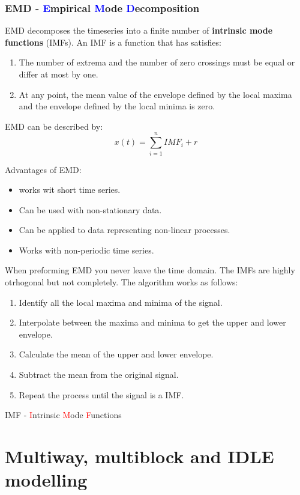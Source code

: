 \subsubsection{EMD - \textcolor{blue}{E}mpirical \textcolor{blue}{M}ode \textcolor{blue}{D}ecomposition}
EMD decomposes the timeseries into a finite number of \textbf{intrinsic mode functions} (IMFs). An IMF is a function that has satisfies:
\begin{enumerate}
    \item The number of extrema and the number of zero crossings must be equal or differ at most by one.
    \item At any point, the mean value of the envelope defined by the local maxima and the envelope defined by the local minima is zero.
\end{enumerate}
EMD can be described by:
\begin{equation}
    x(t) = \sum_{i=1}^{n} IMF_i + r
\end{equation}

Advantages of EMD:
\begin{itemize}
    \item works wit short time series.
    \item Can be used with non-stationary data.
    \item Can be applied to data representing non-linear processes.
    \item Works with non-periodic time series.
\end{itemize}
When preforming EMD you never leave the time domain. The IMFs are highly otrhogonal but not completely. The algorithm works as follows:
\begin{enumerate}
    \item Identify all the local maxima and minima of the signal.
    \item Interpolate between the maxima and minima to get the upper and lower envelope.
    \item Calculate the mean of the upper and lower envelope.
    \item Subtract the mean from the original signal.
    \item Repeat the process until the signal is a IMF.
\end{enumerate}

IMF - \textcolor{red}{I}ntrinsic \textcolor{red}{M}ode \textcolor{red}{F}unctions


\section{Multiway, multiblock and IDLE modelling}

